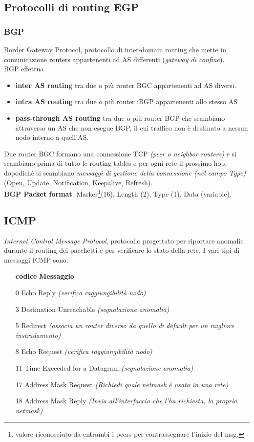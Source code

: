 \documentclass[a4paper,11pt]{article}
\begin{document}
\subsection{Protocolli di routing EGP}
\subsubsection{BGP}
Border Gateway Protocol, protocollo di inter-domain routing che mette in comunicazione routers appartenenti ad AS differenti (\textit{gateway di confine}).\\
BGP effettua 
\begin{itemize}
\item\textbf{inter AS routing} tra due o più router BGC appartenenti ad AS diversi. 
\item\textbf{intra AS routing} tra due o più router iBGP appartenenti allo stesso AS
\item\textbf{pass-through AS routing} tra due o più router BGP che scambiano attraverso un AS che non esegue BGP, il cui traffico non è destinato a nessun nodo interno a quell'AS.
\end{itemize}
Due router BGC formano una connessione TCP \textit{(peer o neighbor routers)} e si scambiano prima di tutto le routing tables e per ogni rete il prossimo hop, dopodichè si scambiano \textit{messaggi di gestione della connessione (nel campo Type)} (Open, Update, Notification, Keepalive, Refresh).\\
\textbf{BGP Packet format}: Marker\footnote{valore riconosciuto da entrambi i peers per contrassegnare l'inizio del msg.}(16), Length (2), Type (1), Data (variable).                                                                                                                  
                                                                                                                  
\subsection{ICMP}
\textit{Internet Control Message Protocol}, protocollo progettato per riportare anomalie durante il routing dei pacchetti e per verificare lo stato della rete. I vari tipi di messaggi ICMP sono:
\begin{itemize}
\item[\textbf{codice}] \textbf{Messaggio}
\item[0] Echo Reply \textit{(verifica raggiungibilità nodo)}
\item[3] Destination Unreachable \textit{(segnalazione anomalia)}
\item[5] Redirect \textit{(associa un router diverso da quello di default per un migliore instradamento)}
\item[8] Echo Request \textit{(verifica raggiungibilità nodo)}
\item[11] Time Exceeded for a Datagram \textit{(segnalazione anomalia)}
\item[17] Address Mask Request \textit{(Richiedi quale netmask è usata in una rete)}
\item[18] Address Mask Reply \textit{(Invia all'interfaccia che l'ha richiesta, la propria netmask)}
\end{itemize} \newpage
\end{document}
